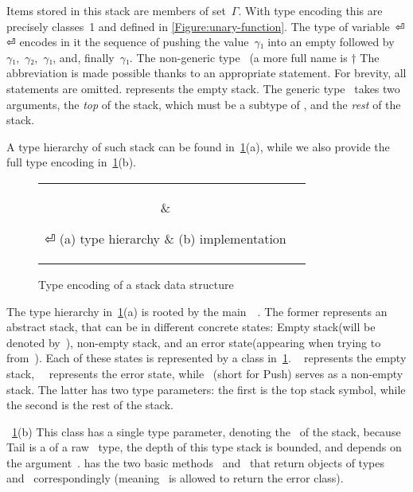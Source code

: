 Items stored in this stack are members of set~$Γ$.
With type encoding this are precisely classes~1
  and  defined in \cref{Figure:unary-function}.
The type of variable~⏎
\mbox{\qquad\qquad}⏎
encodes in it the sequence of pushing the value~$γ₁$ into an
  empty followed by~$γ₁$,~$γ₂$,~$γ₁$, and, finally~$γ₁$.
  The non-generic type~ (a more full name is †{%
    The~ abbreviation is made possible
      thanks to an appropriate  statement.
      For brevity, all  statements are omitted.}
  represents the empty stack.
The generic type~ takes two arguments, the \emph{top} of the stack,
    which must be a subtype of , and the \emph{rest} of the stack.

A type hierarchy of such stack can be found in~\cref{Figure:stack:encoding}(a),
  while we also provide the full \Java type encoding in~\cref{Figure:stack:encoding}(b).

\begin{figure}[htb]
  \caption{\label{Figure:stack:encoding} Type encoding of a stack data structure}
    \begin{tabular}{cc}
      \hspace{-12ex}
      \parbox[c]{0.3\linewidth}{%
        
      }
      &
      \hspace{1ex}
      \parbox[c]{0.86\linewidth}{}
⏎
      \hspace{-12ex} (a) type hierarchy & (b) implementation
    \end{tabular}
\end{figure}

The type hierarchy in~\cref{Figure:stack:encoding}(a) is rooted by the main~~.
The former represents an abstract stack, that can be in different concrete states: Empty stack(will be denoted by~),
  non-empty stack, and an error state(appearing when trying to~ from~).
Each of these states is represented by a class in~\cref{Figure:stack:encoding}.
~ represents the empty stack,~~ represents the error state,
  while ~(short for Push) serves as a non-empty stack.
The latter has two type parameters: the first is the top stack symbol, while the second is the rest of the stack.

~\cref{Figure:stack:encoding}(b) %
This class has a single type parameter, denoting the~ of the stack, because Tail is a
  of a raw~ type, the depth of this type stack is bounded, and depends on the argument~.
 has the two basic methods~ and~ that return objects of types~ and~
  correspondingly (meaning~ is allowed to return the error class).


